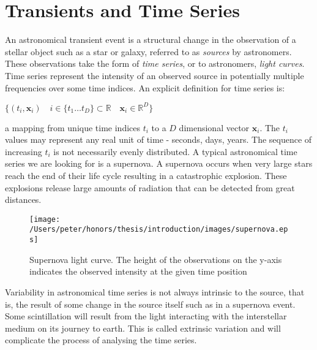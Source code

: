 \section{Transients and Time Series}
	An astronomical transient event is a structural change in the observation of a stellar object such as a star or galaxy, referred to as \emph{sources} by astronomers. These observations take the form of \emph{time series}, or to astronomers, \emph{light curves}. Time series represent the intensity of an observed source in potentially multiple frequencies over some time indices. An explicit definition for time series is:
	\begin{center}
	\begin{math}
		\{(t_i, \mathbf{x}_{i}) \quad i \in \{t_{1} \ldots t_{D}\} \subset \mathbb{R} \quad \mathbf{x}_{i} \in \mathbb{R}^{D} \}
	\end{math}
	\end{center}
	a mapping from unique time indices $t_{i}$ to a $D$ dimensional vector $\mathbf{x}_{i}$. The $t_{i}$ values may represent any real unit of time - seconds, days, years. The sequence of increasing $t_{i}$ is not necessarily evenly distributed. A typical astronomical time series we are looking for is a supernova. A supernova occurs when very large stars reach the end of their life cycle resulting in a catastrophic explosion. These explosions release large amounts of radiation that can be detected from great distances.
	\begin{figure}[ht!]
	\centering
	\texttt{[image: /Users/peter/honors/thesis/introduction/images/supernova.eps]}
	\caption{Supernova light curve. The height of the observations on the y-axis indicates the observed intensity at the given time position}
	\end{figure}
	Variability in astronomical time series is not always intrinsic to the source, that is, the result of some change in the source itself such as in a supernova event. Some scintillation will result from the light interacting with the interstellar medium on its journey to earth. This is called extrinsic variation and will complicate the process of analysing the time series.
